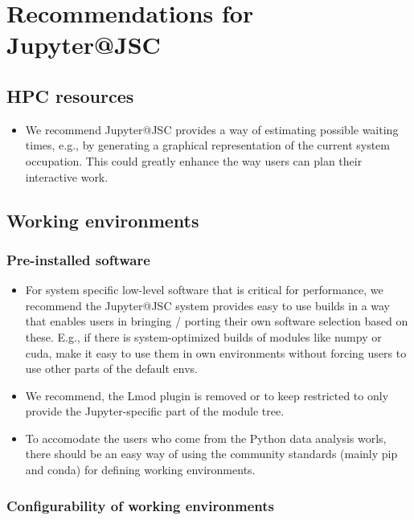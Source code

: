 \section{Recommendations for Jupyter@JSC}

\subsection{HPC resources}

\begin{itemize}
  \item We recommend Jupyter@JSC provides a way of estimating possible waiting times, e.g., by generating a graphical representation of the current system occupation.
  This could greatly enhance the way users can plan their interactive work.
\end{itemize}


\subsection{Working environments}

\subsubsection{Pre-installed software}

\begin{itemize}
  \item For system specific low-level software that is critical for performance, we recommend the Jupyter@JSC system provides easy to use builds in a way that enables users in bringing / porting their own software selection based on these. E.g., if there is system-optimized builds of modules like numpy or cuda, make it easy to use them in own environments without forcing users to use other parts of the default envs.
  \item We recommend, the Lmod plugin is removed or to keep restricted to only provide the Jupyter-specific part of the module tree.
  \item To accomodate the users who come from the Python data analysis worls, there should be an easy way of using the community standards (mainly pip and conda) for defining working environments.
\end{itemize}

\subsubsection{Configurability of working environments}

